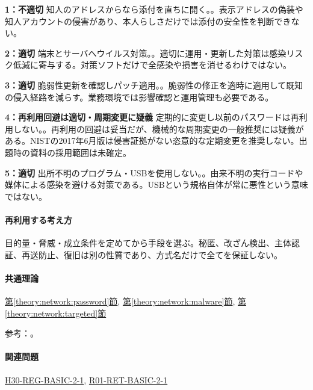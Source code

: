 \noindent\textbf{1：不適切} 知人のアドレスからなら添付を直ちに開く。。表示アドレスの偽装や知人アカウントの侵害があり、本人らしさだけでは添付の安全性を判断できない。\par

\noindent\textbf{2：適切} 端末とサーバへウイルス対策。。適切に運用・更新した対策は感染リスク低減に寄与する。対策ソフトだけで全感染や損害を消せるわけではない。\par

\noindent\textbf{3：適切} 脆弱性更新を確認しパッチ適用。。脆弱性の修正を適時に適用して既知の侵入経路を減らす。業務環境では影響確認と運用管理も必要である。\par

\noindent\textbf{4：再利用回避は適切・周期変更に疑義} 定期的に変更し以前のパスワードは再利用しない。。再利用の回避は妥当だが、機械的な周期変更の一般推奨には疑義がある。NISTの2017年6月版は侵害証拠がない恣意的な定期変更を推奨しない。出題時の資料の採用範囲は未確定。\par

\noindent\textbf{5：適切} 出所不明のプログラム・USBを使用しない。。由来不明の実行コードや媒体による感染を避ける対策である。USBという規格自体が常に悪性という意味ではない。\par

\paragraph{再利用する考え方} 目的量・脅威・成立条件を定めてから手段を選ぶ。秘匿、改ざん検出、主体認証、再送防止、復旧は別の性質であり、方式名だけで全てを保証しない。

\paragraph{共通理論} \hyperref[theory:network:password]{第\ref*{theory:network:password}節}, \hyperref[theory:network:malware]{第\ref*{theory:network:malware}節}, \hyperref[theory:network:targeted]{第\ref*{theory:network:targeted}節}

\par 参考：\cite{net_nist2017,net_target2020,net_ipa_account}。

\paragraph{関連問題} \hyperref[q:h30-reg-basic-2-1]{H30-REG-BASIC-2-1}, \hyperref[q:r01-ret-basic-2-1]{R01-RET-BASIC-2-1}

